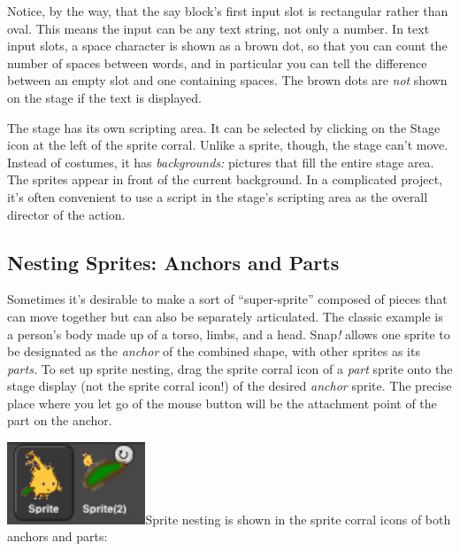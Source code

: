 Notice, by the way, that the say block's first input slot is rectangular
rather than oval. This means the input can be any text string, not only
a number. In text input slots, a space character is shown as a brown
dot, so that you can count the number of spaces between words, and in
particular you can tell the difference between an empty slot and one
containing spaces. The brown dots are \emph{not} shown on the stage if
the text is displayed.

The stage has its own scripting area. It can be selected by clicking on
the Stage icon at the left of the sprite corral. Unlike a sprite,
though, the stage can't move. Instead of costumes, it has
\emph{backgrounds:} pictures that fill the entire stage area. The
sprites appear in front of the current background. In a complicated
project, it's often convenient to use a script in the stage's scripting
area as the overall director of the action.

\subsection{Nesting Sprites: Anchors and
Parts}\label{nesting-sprites-anchors-and-parts}

Sometimes it's desirable to make a sort of ``super-sprite'' composed of
pieces that can move together but can also be separately articulated.
The classic example is a person's body made up of a torso, limbs, and a
head. Snap\emph{!} allows one sprite to be designated as the
\emph{anchor} of the combined shape, with other sprites as its
\emph{parts.} To set up sprite nesting, drag the sprite corral icon of a
\emph{part} sprite onto the stage display (not the sprite corral icon!)
of the desired \emph{anchor} sprite. The precise place where you let go
of the mouse button will be the attachment point of the part on the
anchor.

\includegraphics[width=1.63056in,height=0.96528in]{media/image47.png}Sprite
nesting is shown in the sprite corral icons of both anchors and parts:


